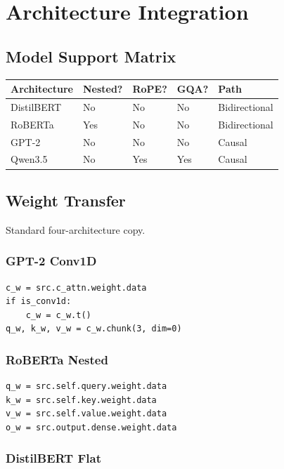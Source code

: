 
\section{Architecture Integration}

\subsection{Model Support Matrix}

\begin{table}[H]
\centering
\small
\begin{tabular}{lllll}
\toprule
\textbf{Architecture} & \textbf{Nested?} & \textbf{RoPE?} & \textbf{GQA?} & \textbf{Path} \\
\midrule
DistilBERT & No & No & No & Bidirectional \\
RoBERTa & Yes & No & No & Bidirectional \\
GPT-2 & No & No & No & Causal \\
Qwen3.5 & No & Yes & Yes & Causal \\
\bottomrule
\end{tabular}
\end{table}

\subsection{Weight Transfer}

Standard four-architecture copy.

\subsubsection{GPT-2 Conv1D}

\begin{lstlisting}
c_w = src.c_attn.weight.data
if is_conv1d:
    c_w = c_w.t()
q_w, k_w, v_w = c_w.chunk(3, dim=0)
\end{lstlisting}

\subsubsection{RoBERTa Nested}

\begin{lstlisting}
q_w = src.self.query.weight.data
k_w = src.self.key.weight.data
v_w = src.self.value.weight.data
o_w = src.output.dense.weight.data
\end{lstlisting}

\subsubsection{DistilBERT Flat}

